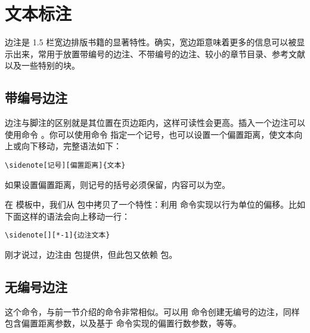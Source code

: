 \setchapterpreamble[u]{\margintoc}
\chapter{文本标注}

边注是 1.5 栏宽边排版书籍的显著特性。确实，宽边距意味着更多的信息可以被显示出来，常用于放置带编号的边注、不带编号的边注、较小的章节目录、参考文献以及一些特别的块。

\section{带编号边注}

边注与脚注的区别就是其位置在页边距内，这样可读性会更高。插入一个边注可以使用命令 。你可以使用命令  指定一个记号，也可以设置一个偏置距离，使文本向上或向下移动，完整语法如下：

\begin{lstlisting}[style=kaolstplain]
\sidenote[记号][偏置距离]{文本}
\end{lstlisting}

如果设置偏置距离，则记号的括号必须保留，内容可以为空。

在  模板中，我们从  包中拷贝了一个特性：利用  命令实现以行为单位的偏移。比如下面这样的语法会向上移动一行：

\begin{lstlisting}[style=kaolstplain]
\sidenote[][*-1]{边注文本}
\end{lstlisting}

刚才说过，边注由  包提供，但此包又依赖  包。

\section{无编号边注}

这个命令，与前一节介绍的命令非常相似。可以用  命令创建无编号的边注，同样包含偏置距离参数，以及基于  命令实现的偏置行数参数，等等。

